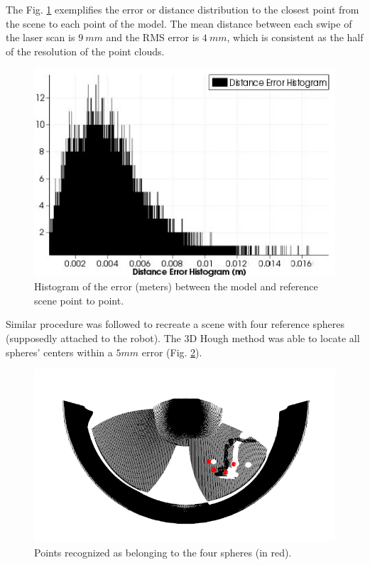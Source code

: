 The Fig. \ref{fig:histogram} exemplifies the error or distance distribution
to the closest point from the scene to each point of the model. The mean
distance between each swipe of the laser scan is $9~mm$ and the
RMS error is $4~mm$, which is consistent as the half of the resolution of the
point clouds.

\begin{figure}
	\centering
	\includegraphics[width=.95\columnwidth]{figs/results/histogram}
    \caption{Histogram of the error (meters) between the model and reference
    scene point to point.}
    \label{fig:histogram}
\end{figure}

Similar procedure was followed to recreate a scene with four reference spheres
(supposedly attached to the robot). The 3D Hough method was able to locate all
spheres' centers within a $5mm$ error (Fig. \ref{fig:sphere_hough}).

\begin{figure}
	\centering
	\includegraphics[width=.95\columnwidth]{figs/results/SphereHough}
    \caption{Points recognized as belonging to the four spheres (in red).}
    \label{fig:sphere_hough}
\end{figure}

